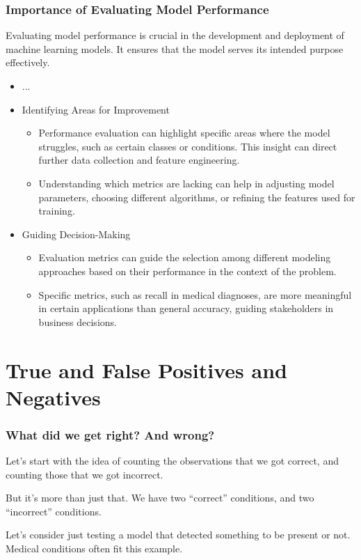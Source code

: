 \documentclass[aspectratio=169]{beamer} %
\begin{document}
	\begin{frame}
		\frametitle{Importance of Evaluating Model Performance}
		Evaluating model performance is crucial in the development and deployment of machine learning models. It ensures that the model serves its intended purpose effectively.
		\begin{itemize}
			\item ...
			\item Identifying Areas for Improvement
			\begin{itemize}
				\item Performance evaluation can highlight specific areas where the model struggles, such as certain classes or conditions. This insight can direct further data collection and feature engineering.
				\item Understanding which metrics are lacking can help in adjusting model parameters, choosing different algorithms, or refining the features used for training.
			\end{itemize}
			\item Guiding Decision-Making
			\begin{itemize}
				\item Evaluation metrics can guide the selection among different modeling approaches based on their performance in the context of the problem.
				\item Specific metrics, such as recall in medical diagnoses, are more meaningful in certain applications than general accuracy, guiding stakeholders in business decisions.
			\end{itemize}
		\end{itemize}
	\end{frame}

\section{True and False Positives and Negatives}
	\begin{frame}
	\frametitle{What did we get right? And wrong?}
		Let's start with the idea of counting the observations that we got correct, and counting those that we got incorrect.

		But it's more than just that.  We have two ``correct'' conditions, and two ``incorrect'' conditions.

		Let's consider just testing a model that detected something to be present or not.  Medical conditions often fit this example.
	\end{frame}
\end{document}
